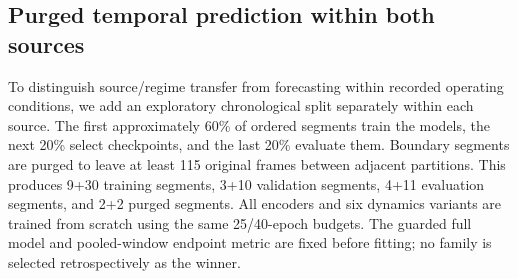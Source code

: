 \documentclass[preprint,12pt]{elsarticle}
\begin{document}
\subsection{Purged temporal prediction within both sources}\label{sec:temporal}
To distinguish source/regime transfer from forecasting within recorded operating
conditions, we add an exploratory chronological split separately within each
source. The first approximately 60\% of ordered segments train the models,
the next 20\% select checkpoints, and the last 20\% evaluate them. Boundary
segments are purged to leave at least 115 original frames between adjacent
partitions. This produces 9+30 training segments, 3+10 validation segments,
4+11 evaluation segments, and 2+2 purged segments.
All encoders and six dynamics variants are trained from scratch using the same
25/40-epoch budgets. The guarded full model and pooled-window endpoint metric
are fixed before fitting; no family is selected retrospectively as the winner.
\end{document}
